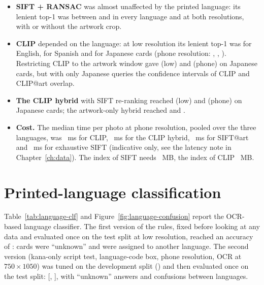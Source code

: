 \begin{itemize}
  \item \textbf{SIFT + RANSAC} was almost unaffected by the printed language: its lenient top-1 was between  and  in every language and at both resolutions, with or without the artwork crop.
  \item \textbf{CLIP} depended on the language: at low resolution its lenient top-1 was  for English,  for Spanish and  for Japanese cards (phone resolution: , , ). Restricting CLIP to the artwork window gave  (low) and  (phone) on Japanese cards, but with only  Japanese queries the confidence intervals of CLIP and CLIP@art overlap.
  \item \textbf{The CLIP hybrid} with SIFT re-ranking reached  (low) and  (phone) on Japanese cards; the artwork-only hybrid reached  and .
  \item \textbf{Cost.} The median time per photo at phone resolution, pooled over the three languages, was ~ms for CLIP, ~ms for the CLIP hybrid, ~ms for SIFT@art and ~ms for exhaustive SIFT (indicative only, see the latency note in Chapter~\ref{ch:data}). The index of SIFT needs ~MB, the index of CLIP ~MB.
\end{itemize}

\section{Printed-language classification}
\label{sec:res-language-clf}

Table~\ref{tab:language-clf} and Figure~\ref{fig:language-confusion} report the OCR-based language classifier. The first version of the rules, fixed before looking at any data and evaluated once on the test split at low resolution, reached an accuracy of :  cards were ``unknown'' and  were assigned to another language. The second version (kana-only script test, language-code box, phone resolution, OCR at $750\times1050$) was tuned on the development split () and then evaluated once on the test split:  {\small[, ]}, with  ``unknown'' answers and  confusions between languages.

